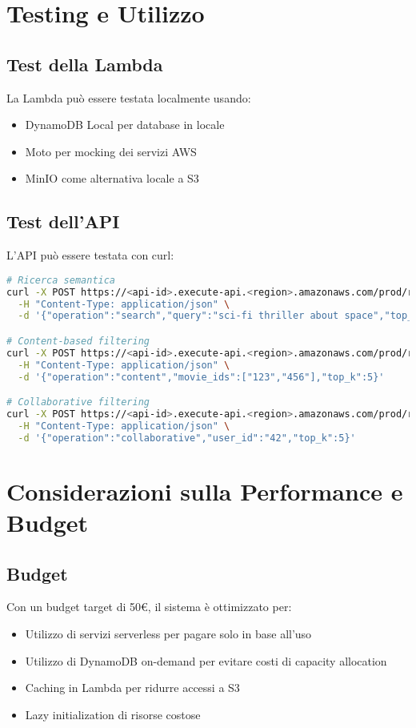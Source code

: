 \documentclass[11pt,a4paper]{article}
\begin{document}
\section{Testing e Utilizzo}
\subsection{Test della Lambda}
La Lambda può essere testata localmente usando:

\begin{itemize}
  \item DynamoDB Local per database in locale
  \item Moto per mocking dei servizi AWS
  \item MinIO come alternativa locale a S3
\end{itemize}

\subsection{Test dell'API}
L'API può essere testata con curl:

\begin{lstlisting}[language=bash]
# Ricerca semantica
curl -X POST https://<api-id>.execute-api.<region>.amazonaws.com/prod/recommend \
  -H "Content-Type: application/json" \
  -d '{"operation":"search","query":"sci-fi thriller about space","top_k":5}'

# Content-based filtering
curl -X POST https://<api-id>.execute-api.<region>.amazonaws.com/prod/recommend \
  -H "Content-Type: application/json" \
  -d '{"operation":"content","movie_ids":["123","456"],"top_k":5}'

# Collaborative filtering
curl -X POST https://<api-id>.execute-api.<region>.amazonaws.com/prod/recommend \
  -H "Content-Type: application/json" \
  -d '{"operation":"collaborative","user_id":"42","top_k":5}'
\end{lstlisting}

\section{Considerazioni sulla Performance e Budget}
\subsection{Budget}
Con un budget target di 50€, il sistema è ottimizzato per:

\begin{itemize}
  \item Utilizzo di servizi serverless per pagare solo in base all'uso
  \item Utilizzo di DynamoDB on-demand per evitare costi di capacity allocation
  \item Caching in Lambda per ridurre accessi a S3
  \item Lazy initialization di risorse costose
\end{itemize}
\end{document}
